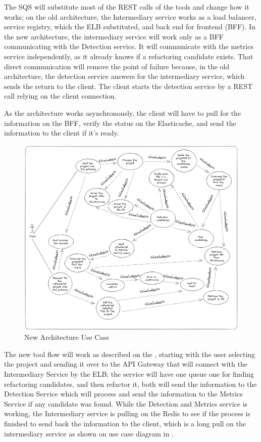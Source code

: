 The SQS will substitute most of the REST calls of the tools and change how it works; on the old architecture, the Intermediary service works as a load balancer, service registry, which the ELB substituted, and back end for frontend (BFF). In the new architecture, the intermediary service will work only as a BFF communicating with the Detection service. It will communicate with the metrics service independently, as it already knows if a refactoring candidate exists. That direct communication will remove the point of failure because, in the old architecture, the detection service answers for the intermediary service, which sends the return to the client. The client starts the detection service by a REST call relying on the client connection.

As the architecture works asynchronously, the client will have to pull for the information on the BFF, verify the status on the Elasticache, and send the information to the client if it's ready.

\begin{figure}[ht!]
\SetCaptionWidth{\textwidth}
\caption{New Architecture Use Case}
\label{fig-usecasenew}
\includegraphics[width =\textwidth, scale=0.2]{Chapter-4/Figures/usecasenew.png}
\end{figure}


The new tool flow will work as described on the , starting with the user selecting the project and sending it over to the API Gateway that will connect with the Intermediary Service by the ELB; the service will have one queue one for finding refactoring candidates, and then refactor it, both will send the information to the Detection Service which will process and send the information to the Metrics Service if any candidate was found. While the Detection and Metrics service is working, the Intermediary service is pulling on the Redis to see if the process is finished to send back the information to the client, which is a long pull on the intermediary service as shown on use case diagram in .


